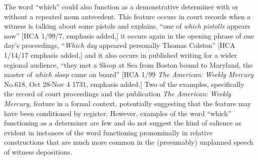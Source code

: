   The word “which” could also function as a demonstrative determiner with or without a repeated noun antecedent. This feature occurs in court records when a witness is talking about some pistols and explains, “one of \textit{which} \textit{pistolls} appears now” [HCA 1/99/7, emphasis added,] it occurs again in the opening phrase of one day’s proceedings, “\textit{Which} \textit{day} appeared personally Thomas Colston” [HCA 1/14/17 emphasis added,] and it also occurs in published writing for a wider regional audience, “they met a Sloop at Sea from Boston bound to Maryland, the master of \textit{which} \textit{sloop} came on board” [HCA 1/99 \textit{The} \textit{American:} \textit{Weekly} \textit{Mercury} No.618, Oct 28-Nov 4 1731, emphasis added.] Two of the examples, specifically the record of court proceedings and the publication \textit{The} \textit{American:} \textit{Weekly} \textit{Mercury,} feature in a formal context, potentially suggesting that the feature may have been conditioned by register. However, examples of the word “which” functioning as a determiner are few and do not suggest the kind of salience as evident in instances of the word functioning pronominally in relative constructions that are much more common in the (presumably) unplanned speech of witness depositions. 

